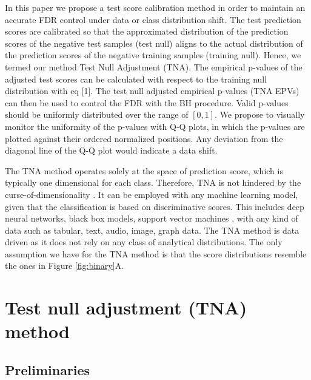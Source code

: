 \documentclass{article}
\begin{document}
In this paper we propose a test score calibration method in order to maintain an accurate FDR control under data or class distribution shift. The test prediction scores are calibrated so that the approximated distribution of the prediction scores of the negative test samples (test null) aligns to the actual distribution of the prediction scores of the negative training samples (training null). Hence, we termed our method Test Null Adjustment (TNA). The empirical p-values of the adjusted test scores can be calculated with respect to the training null distribution with eq [1]. The test null adjusted empirical p-values (TNA EPVs) can then be used to control the FDR with the BH procedure. Valid p-values should be uniformly distributed over the range of $[0,1]$.  We propose to visually monitor the uniformity of the p-values with Q-Q plots, in which the p-values are plotted against their ordered normalized positions. Any deviation from the diagonal line of the Q-Q plot would indicate a data shift.



The TNA method operates solely at the space of prediction score, which is typically one dimensional for each class. Therefore, TNA is not hindered by the curse-of-dimensionality \cite{donoho2000high}. It can be employed with any machine learning model, given that the classification is based on discriminative scores. This includes deep neural networks, black box models, support vector machines \cite{cristianini2000introduction}, with any kind of data such as tabular, text, audio, image, graph data. The TNA method is data driven as it does not rely on any class of analytical distributions. The only assumption we have for the TNA method is that the score distributions resemble the ones in Figure \ref{fig:binary}A.



\section{Test null adjustment (TNA) method}
\subsection{Preliminaries}
\end{document}
